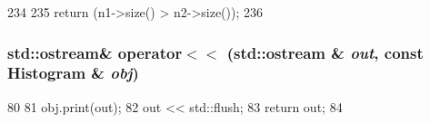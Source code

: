 \begin{DoxyCode}
234 {
235     return (n1->size() > n2->size());
236 }
\end{DoxyCode}
\hypertarget{Histogram_8hh_ae356c184f05019b81e5b392dd80e0e78}{
\subsubsection[{operator$<$$<$}]{\setlength{\rightskip}{0pt plus 5cm}std::ostream\& operator$<$$<$ (std::ostream \& {\em out}, \/  const {\bf Histogram} \& {\em obj})}}
\label{Histogram_8hh_ae356c184f05019b81e5b392dd80e0e78}



\begin{DoxyCode}
80 {
81     obj.print(out);
82     out << std::flush;
83     return out;
84 }
\end{DoxyCode}
